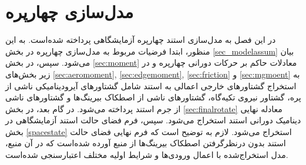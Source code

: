 \chapter{مدل‌سازی چهارپره}
 در این فصل به مدل‌سازی استند چهارپره آزمایشگاهی  پرداخته شده‌است. به این منظور، ابتدا فرضیات مربوط به 
 مدل‌سازی چهارپره در بخش
\ref{sec_modelassum}
 بیان می‌شود. سپس، در بخش
 \ref{sec:moment}
 معادلات حاکم بر حرکات دورانی چهارپره و در زیر بخش‌های
 \ref{sec:aeromoment},
 \ref{sec:edgemoment},
 \ref{sec:friction}
 و
 \ref{sec:mgmoent}
   به استخراج گشتاورهای خارجی اعمالی 
 به استند شامل گشتاورهای آیرودینامیکی ناشی از پره، گشتاور نیروی تکیه‌گاه، گشتاورهای ناشی از 
 اصطکاک بیرینگ‌ها و  گشتاورهای ناشی از جرم استند پرداخته می‌شود. در گام بعد، در بخش
 \ref{sec:finalrotate}
 معادله نهایی دینامیک دورانی استند 
 استخراج می‌شود. سپس، فرم فضای حالت استند آزمایشگاهی در بخش
 \ref{spacestate}
 استخراج می‌شود. لازم به 
 توضیح است که فرم نهایی فضای حالت استند بدون درنظرگرفتن اصطکاک بیرینگ‌ها از منبع
 \cite{Abeshtan}
 آورده ‌شده‌است که در آن منبع، مدل استخراج‌شده با اعمال ورودی‌ها و شرایط اولیه مختلف 
 اعتبارسنجی شده‌‌است.